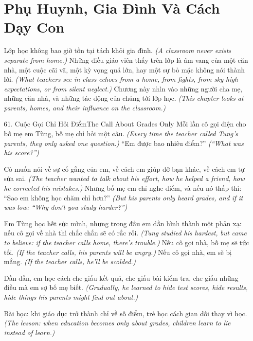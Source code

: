 \chapter{Phụ Huynh, Gia Đình Và Cách Dạy Con}

\begin{leadbox}
Lớp học không bao giờ tồn tại tách khỏi gia đình.
\textit{(A classroom never exists separate from home.)}
Những điều giáo viên thấy trên lớp là âm vang của một căn nhà, một cuộc cãi vã, một kỳ vọng quá lớn, hay một sự bỏ mặc không nói thành lời.
\textit{(What teachers see in class echoes from a home, from fights, from sky-high expectations, or from silent neglect.)}
Chương này nhìn vào những người cha mẹ, những căn nhà, và những tác động của chúng tới lớp học.
\textit{(This chapter looks at parents, homes, and their influence on the classroom.)}
\end{leadbox}

\begin{truyen}{61. Cuộc Gọi Chỉ Hỏi Điểm}{The Call About Grades Only}
Mỗi lần cô gọi điện cho bố mẹ em Tùng, bố mẹ chỉ hỏi một câu.
\textit{(Every time the teacher called Tung's parents, they only asked one question.)}
``Em được bao nhiêu điểm?''
\textit{(``What was his score?'')}

Cô muốn nói về sự cố gắng của em, về cách em giúp đỡ bạn khác, về cách em tự sửa sai.
\textit{(The teacher wanted to talk about his effort, how he helped a friend, how he corrected his mistakes.)}
Nhưng bố mẹ em chỉ nghe điểm, và nếu nó thấp thì: ``Sao em không học chăm chỉ hơn?''
\textit{(But his parents only heard grades, and if it was low: ``Why don't you study harder?'')}

Em Tùng học hết sức mình, nhưng trong đầu em dần hình thành một phản xạ: nếu cô gọi về nhà thì chắc chắn sẽ có rắc rối.
\textit{(Tung studied his hardest, but came to believe: if the teacher calls home, there's trouble.)}
Nếu cô gọi nhà, bố mẹ sẽ tức tối.
\textit{(If the teacher calls, his parents will be angry.)}
Nếu cô gọi nhà, em sẽ bị mắng.
\textit{(If the teacher calls, he'll be scolded.)}

Dần dần, em học cách che giấu kết quả, che giấu bài kiểm tra, che giấu những điều mà em sợ bố mẹ biết.
\textit{(Gradually, he learned to hide test scores, hide results, hide things his parents might find out about.)}

Bài học: khi giáo dục trở thành chỉ về số điểm, trẻ học cách gian dối thay vì học.
\textit{(The lesson: when education becomes only about grades, children learn to lie instead of learn.)}
\end{truyen}

